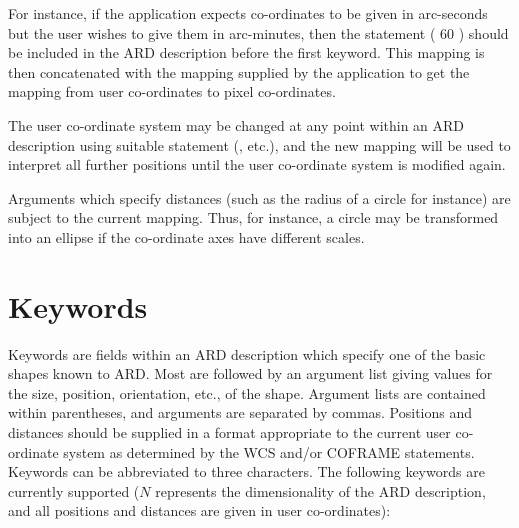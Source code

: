 For instance, if the application expects co-ordinates to be given in
arc-seconds but the user wishes to give them in arc-minutes, then the
statement ( 60 ) should be included in the ARD
description before the first keyword. This mapping is then concatenated
with the mapping supplied by the application to get the mapping from user
co-ordinates to pixel co-ordinates.

The user co-ordinate system may be changed at any point within an ARD
description using suitable statement (, etc.),
and the new mapping will be used to interpret all further positions until
the user co-ordinate system is modified again.

Arguments which specify distances (such as the radius of a circle for instance)
are subject to the current mapping. Thus, for instance, a circle may be
transformed into an ellipse if the co-ordinate axes have different scales. 

\section{\label{SEC:KEYW}Keywords}
Keywords are fields within an ARD description which specify one of the
basic shapes known to ARD. Most are followed by an argument list giving
values for the size, position, orientation, etc., of the shape. Argument
lists are contained within parentheses, and arguments are separated by
commas. Positions and distances should be supplied in a format
appropriate to the current user co-ordinate system as determined by the
WCS and/or COFRAME statements. Keywords can be abbreviated to three
characters. The following keywords are currently supported ($N$
represents the dimensionality of the ARD description, and all positions
and distances are given in user co-ordinates):

